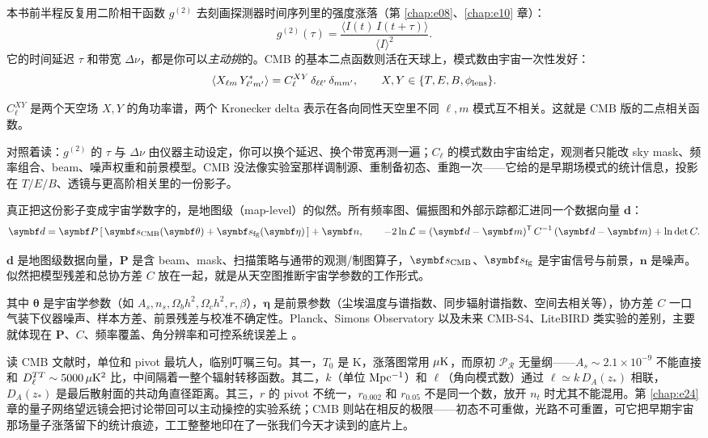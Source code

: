 本书前半程反复用二阶相干函数 \(g^{(2)}\) 去刻画探测器时间序列里的强度涨落（第 \ref{chap:e08}、\ref{chap:e10} 章）：
\[
  g^{(2)}(\tau)=\frac{\langle I(t)\,I(t+\tau)\rangle}{\langle I\rangle^2}.
\]
它的时间延迟 \(\tau\) 和带宽 \(\Delta\nu\)，都是你可以\emph{主动挑}的。CMB 的基本二点函数则活在天球上，模式数由宇宙一次性发好：
\begin{equation}
  \langle X_{\ell m}\,Y^*_{\ell'm'}\rangle=C_\ell^{XY}\,\delta_{\ell\ell'}\,\delta_{mm'},
  \qquad
  X,Y\in\{T,E,B,\phi_{\rm lens}\}.
  \label{eq:e23-cmb-correlator}
\end{equation}
\begin{formulaexplain}
\(C_\ell^{XY}\) 是两个天空场 \(X,Y\) 的角功率谱，两个 Kronecker delta 表示在各向同性天空里不同 \(\ell,m\) 模式互不相关。这就是 CMB 版的二点相关函数。
\end{formulaexplain}
对照着读：\(g^{(2)}\) 的 \(\tau\) 与 \(\Delta\nu\) 由仪器主动设定，你可以换个延迟、换个带宽再测一遍；\(C_\ell\) 的模式数由宇宙给定，观测者只能改 sky mask、频率组合、beam、噪声权重和前景模型。CMB 没法像实验室那样调制源、重制备初态、重跑一次——它给的是早期场模式的统计信息，投影在 \(T/E/B\)、透镜与更高阶相关里的一份影子。

真正把这份影子变成宇宙学数字的，是地图级（map-level）的似然。所有频率图、偏振图和外部示踪都汇进同一个数据向量 \(\bm d\)：
\begin{equation}
  \bm d=\bm P\,[\,\bm s_{\rm CMB}(\bm\theta)+\bm s_{\rm fg}(\bm\eta)\,]+\bm n,
  \qquad
  -2\ln\mathcal L=(\bm d-\bm m)^{\mathsf T}\,C^{-1}\,(\bm d-\bm m)+\ln\det C .
  \label{eq:e23-cmb-likelihood}
\end{equation}
\begin{formulaexplain}
\(\bm d\) 是地图级数据向量，\(\bm P\) 是含 beam、mask、扫描策略与通带的观测/制图算子，\(\bm s_{\rm CMB}\)、\(\bm s_{\rm fg}\) 是宇宙信号与前景，\(\bm n\) 是噪声。似然把模型残差和总协方差 \(C\) 放在一起，就是从天空图推断宇宙学参数的工作形式。
\end{formulaexplain}
其中 \(\bm\theta\) 是宇宙学参数（如 \(A_s,n_s,\Omega_bh^2,\Omega_ch^2,r,\beta\)），\(\bm\eta\) 是前景参数（尘埃温度与谱指数、同步辐射谱指数、空间去相关等），协方差 \(C\) 一口气装下仪器噪声、样本方差、前景残差与校准不确定性。Planck、Simons Observatory 以及未来 CMB-S4、LiteBIRD 类实验的差别，主要就体现在 \(\bm P\)、\(C\)、频率覆盖、角分辨率和可控系统误差上 \citep{2016A&A...594A..13P,2016A&A...594A..20P,2017MNRAS.472.1195C,2019JCAP...02..056A,2020A&A...641A...6P}。

读 CMB 文献时，单位和 pivot 最坑人，临别叮嘱三句。其一，\(T_0\) 是 K，涨落图常用 \(\mu{\rm K}\)，而原初 \(\mathcal P_{\mathcal R}\) 无量纲——\(A_s\sim2.1\times10^{-9}\) 不能直接和 \(D_\ell^{TT}\sim5000\,\mu{\rm K}^2\) 比，中间隔着一整个辐射转移函数。其二，\(k\)（单位 \({\rm Mpc^{-1}}\)）和 \(\ell\)（角向模式数）通过 \(\ell\simeq k\,D_A(z_*)\) 相联，\(D_A(z_*)\) 是最后散射面的共动角直径距离。其三，\(r\) 的 pivot 不统一，\(r_{0.002}\) 和 \(r_{0.05}\) 不是同一个数，放开 \(n_t\) 时尤其不能混用。第 \ref{chap:e24} 章的量子网络望远镜会把讨论带回可以主动操控的实验系统；CMB 则站在相反的极限——初态不可重做，光路不可重置，可它把早期宇宙那场量子涨落留下的统计痕迹，工工整整地印在了一张我们今天才读到的底片上。

